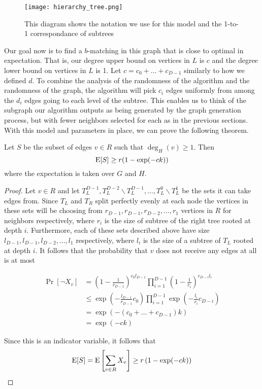 \begin{figure}[h]
\centering
\texttt{[image: hierarchy\_tree.png]}
\begin{minipage}[h]{0.7\textwidth}
\caption{This diagram shows the notation we use for this model and the 1-to-1 correspondance of subtrees}
\end{minipage}
\end{figure}

Our goal now is to find a $b$-matching in this graph that is close to
optimal in expectation. That is, our degree upper bound on vertices in
$L$ is $c$ and the degree lower bound on vertices in $L$ is 1. Let $c
= c_0 + \ldots + c_{D-1}$ similarly to how we defined $d$. 
To combine the analysis of the randomness of the algorithm
and the randomness of the graph, the algorithm will pick $c_{i}$ edges
uniformly from among the $d_{i}$ edges going to each level of the
subtree. This enables us to think of the subgraph our algorithm
outputs as being generated by the graph generation process, but with
fewer neighbors selected for each as in the previous sections. With
this model and parameters in place, we can prove the following
theorem.\

\begin{thm}
Let $S$ be the subset of edges $v\in R$ such that $\deg_H(v) \geq 1$. Then
\[ \text{E}[S] \geq r(1-\exp(-ck)) \]
where the expectation is taken over $G$ and $H$.
\end{thm}

\begin{proof}
Let $v\in R$ and let $T_L^{D-1}, T_L^{D-2}\backslash T_L^{D-1},
\ldots, T_L^0\backslash T_L^1$ be the sets it can take edges
from. Since $T_L$ and $T_R$ split perfectly evenly at each node the
vertices in these sets will be choosing from $r_{D-1}, r_{D-1},
r_{D-2},\ldots, r_{1}$ vertices in $R$ for neighbors respectively,
where $r_i$ is the size of subtree of the right tree rooted at depth
$i$. Furthermore, each of these sets described above have size
$l_{D-1}, l_{D-1}, l_{D-2}, \ldots, l_{1}$ respectively, where $l_i$
is the size of a subtree of $T_L$ rooted at depth $i$. It follows that
the probability that $v$ does not receive any edges at all is at most

\begin{align*}
	      \Pr[\lnot X_v] 
	&=    \left(1-\frac{1}{r_{D-1}}\right)^{c_0l_{D-1}}\prod_{i=1}^{D-1}\left(1 - \frac{1}{r_i}\right)^{c_{D-i} l_i} \\
	&\leq \exp\left(-\frac{l_{D-1}}{r_{D-1}}c_0\right)\prod_{i=1}^{D-1} \exp\left(-\frac{l_i}{r_i}c_{D-i}\right) \\
	&=    \exp\left(-(c_0 + \ldots + c_{D-1})k\right) \\
	&=    \exp(-ck)
\end{align*}

Since this is an indicator variable, it follows that 
\[ \text{E}[S] = \text{E}\left[\sum_{v \in R} X_v \right] \geq r \left(1-\exp(-ck)\right) \]
\end{proof}

